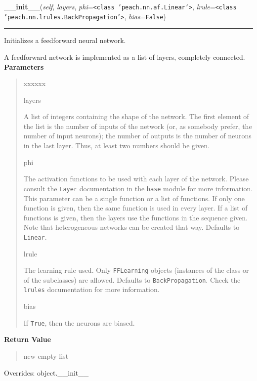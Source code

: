 \hspace{.8\funcindent}\begin{boxedminipage}{\funcwidth}

    \raggedright \textbf{\_\_init\_\_}(\textit{self}, \textit{layers}, \textit{phi}={\tt {\textless}class 'peach.nn.af.Linear'{\textgreater}}, \textit{lrule}={\tt {\textless}class 'peach.nn.lrules.BackPropagation'{\textgreater}}, \textit{bias}={\tt False})

    \vspace{-1.5ex}

    \rule{\textwidth}{0.5\fboxrule}
\setlength{\parskip}{2ex}

Initializes a feedforward neural network.

A feedforward network is implemented as a list of layers, completely
connected.
\setlength{\parskip}{1ex}
      \textbf{Parameters}
      \vspace{-1ex}

      \begin{quote}
        \begin{Ventry}{xxxxxx}

          \item[layers]


A list of integers containing the shape of the network. The first
element of the list is the number of inputs of the network (or, as
somebody prefer, the number of input neurons); the number of outputs
is the number of neurons in the last layer. Thus, at least two
numbers should be given.
          \item[phi]


The activation functions to be used with each layer of the network.
Please consult the \texttt{Layer} documentation in the \texttt{base} module
for more information. This parameter can be a single function or a
list of functions. If only one function is given, then the same
function is used in every layer. If a list of functions is given,
then the layers use the functions in the sequence given. Note that
heterogeneous networks can be created that way. Defaults to
\texttt{Linear}.
          \item[lrule]


The learning rule used. Only \texttt{FFLearning} objects (instances of
the class or of the subclasses) are allowed. Defaults to
\texttt{BackPropagation}. Check the \texttt{lrules} documentation for more
information.
          \item[bias]


If \texttt{True}, then the neurons are biased.
        \end{Ventry}

      \end{quote}

      \textbf{Return Value}
    \vspace{-1ex}

      \begin{quote}

new empty list
      \end{quote}

      Overrides: object.\_\_init\_\_

    \end{boxedminipage}

